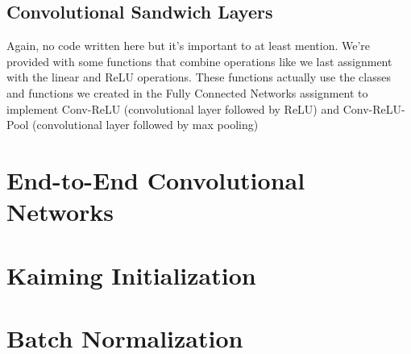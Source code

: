 \documentclass[12pt]{article}
\begin{document}
\subsection{Convolutional Sandwich Layers}
Again, no code written here but it's important to at least mention. We're provided with some functions 
that combine operations like we last assignment with the linear and ReLU operations. These functions 
actually use the classes and functions we created in the Fully Connected Networks assignment to 
implement Conv-ReLU (convolutional  layer followed by ReLU) and Conv-ReLU-Pool (convolutional 
layer followed by max pooling)


\section{End-to-End Convolutional Networks}

\section{Kaiming Initialization}

\section{Batch Normalization}
\end{document}
